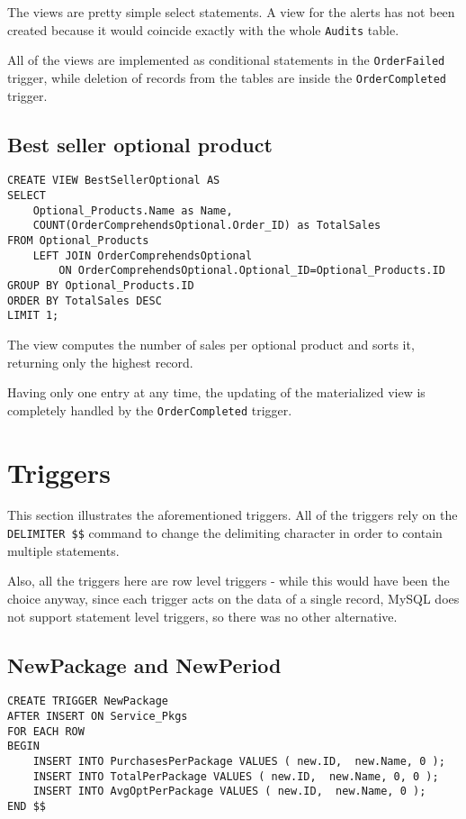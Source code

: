 The views are pretty simple select statements. A view for the alerts has not been created because it would coincide exactly with the whole \texttt{Audits} table.

All of the views are implemented as conditional statements in the \texttt{OrderFailed}  trigger, while deletion of records from the tables are inside the \texttt{OrderCompleted} trigger.

\subsection{Best seller optional product}

\begin{lstlisting}[style=SQL]
CREATE VIEW BestSellerOptional AS
SELECT
    Optional_Products.Name as Name,
    COUNT(OrderComprehendsOptional.Order_ID) as TotalSales
FROM Optional_Products
    LEFT JOIN OrderComprehendsOptional
        ON OrderComprehendsOptional.Optional_ID=Optional_Products.ID
GROUP BY Optional_Products.ID
ORDER BY TotalSales DESC
LIMIT 1;
\end{lstlisting}

The view computes the number of sales per optional product and sorts it, returning only the highest record.

Having only one entry at any time, the updating of the materialized view is completely handled by the \texttt{OrderCompleted} trigger.


\section{Triggers}
\label{sec:triggers}

This section illustrates the aforementioned triggers. All of the triggers rely on the \texttt{DELIMITER \$\$} command to change the delimiting character in order to contain multiple statements.

Also, all the triggers here are row level triggers - while this would have been the choice anyway, since each trigger acts on the data of a single record, MySQL does not support statement level triggers, so there was no other alternative.

\subsection {NewPackage and NewPeriod}


\begin{lstlisting}[style=SQL]
CREATE TRIGGER NewPackage
AFTER INSERT ON Service_Pkgs
FOR EACH ROW
BEGIN
    INSERT INTO PurchasesPerPackage VALUES ( new.ID,  new.Name, 0 );
    INSERT INTO TotalPerPackage VALUES ( new.ID,  new.Name, 0, 0 );
    INSERT INTO AvgOptPerPackage VALUES ( new.ID,  new.Name, 0 );
END $$
\end{lstlisting}

